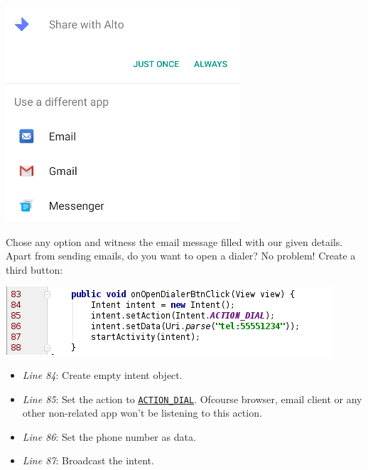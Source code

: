 \begin{center}
	\includegraphics[scale=0.4]{chapters/ch09/images/28}
\end{center}

Chose any option and witness the email message filled with our given details. \\

Apart from sending emails, do you want to open a dialer? No problem! Create a third button:

\begin{center}
	\includegraphics[scale=0.4]{chapters/ch09/images/29}
\end{center}

\begin{itemize}
	\item \textit{Line 84}: Create empty intent object.
	
	\item \textit{Line 85}: Set the action to \href{https://developer.android.com/reference/android/content/Intent.html#ACTION_DIAL}{\texttt{ACTION\_DIAL}}. Ofcourse browser, email client or any other non-related app won't be listening to this action.
	
	\item \textit{Line 86}: Set the phone number as data.
	
	\item \textit{Line 87}: Broadcast the intent.
	
\end{itemize}

